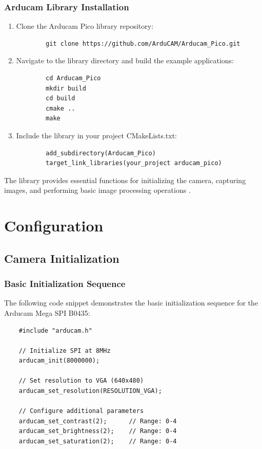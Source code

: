 \subsubsection{Arducam Library Installation}
\begin{enumerate}
	\item Clone the Arducam Pico library repository:
	\begin{verbatim}
		git clone https://github.com/ArduCAM/Arducam_Pico.git
	\end{verbatim}
	
	\item Navigate to the library directory and build the example applications:
	\begin{verbatim}
		cd Arducam_Pico
		mkdir build
		cd build
		cmake ..
		make
	\end{verbatim}
	
	\item Include the library in your project CMakeLists.txt:
	\begin{verbatim}
		add_subdirectory(Arducam_Pico)
		target_link_libraries(your_project arducam_pico)
	\end{verbatim}
\end{enumerate}

The library provides essential functions for initializing the camera, capturing images, and performing basic image processing operations \cite{Arducam:2023}.

\section{Configuration}
\subsection{Camera Initialization}
\subsubsection{Basic Initialization Sequence}
The following code snippet demonstrates the basic initialization sequence for the Arducam Mega SPI B0435:

\begin{verbatim}
	#include "arducam.h"
	
	// Initialize SPI at 8MHz
	arducam_init(8000000);
	
	// Set resolution to VGA (640x480)
	arducam_set_resolution(RESOLUTION_VGA);
	
	// Configure additional parameters
	arducam_set_contrast(2);      // Range: 0-4
	arducam_set_brightness(2);    // Range: 0-4
	arducam_set_saturation(2);    // Range: 0-4
\end{verbatim}

